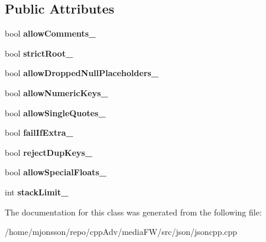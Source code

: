 \subsection*{Public Attributes}
\begin{DoxyCompactItemize}
\item 
\mbox{\label{classJson_1_1OurFeatures_ac71bb7ba7363d3b05ed76602b036ce33}} 
bool {\bfseries allow\+Comments\+\_\+}
\item 
\mbox{\label{classJson_1_1OurFeatures_a2095f66a776c0a4ae6cc931a0c94242e}} 
bool {\bfseries strict\+Root\+\_\+}
\item 
\mbox{\label{classJson_1_1OurFeatures_a13963bc44bf948eec1968f7ff8e8f5f1}} 
bool {\bfseries allow\+Dropped\+Null\+Placeholders\+\_\+}
\item 
\mbox{\label{classJson_1_1OurFeatures_af6973fc7e774ce2d634ba99442aeb91a}} 
bool {\bfseries allow\+Numeric\+Keys\+\_\+}
\item 
\mbox{\label{classJson_1_1OurFeatures_abbd6c196d7a22e2a360a59887eda4610}} 
bool {\bfseries allow\+Single\+Quotes\+\_\+}
\item 
\mbox{\label{classJson_1_1OurFeatures_ae8ad25b90706c78f1a8fe929191ac61b}} 
bool {\bfseries fail\+If\+Extra\+\_\+}
\item 
\mbox{\label{classJson_1_1OurFeatures_a39b8e0b86b1c24a45e800c023bb715aa}} 
bool {\bfseries reject\+Dup\+Keys\+\_\+}
\item 
\mbox{\label{classJson_1_1OurFeatures_af760f91cc2a7af37e44f78fb466061bb}} 
bool {\bfseries allow\+Special\+Floats\+\_\+}
\item 
\mbox{\label{classJson_1_1OurFeatures_a9a786713902d14be6d57a08cc03ccfff}} 
int {\bfseries stack\+Limit\+\_\+}
\end{DoxyCompactItemize}


The documentation for this class was generated from the following file\+:\begin{DoxyCompactItemize}
\item 
/home/mjonsson/repo/cpp\+Adv/media\+F\+W/src/json/jsoncpp.\+cpp\end{DoxyCompactItemize}
